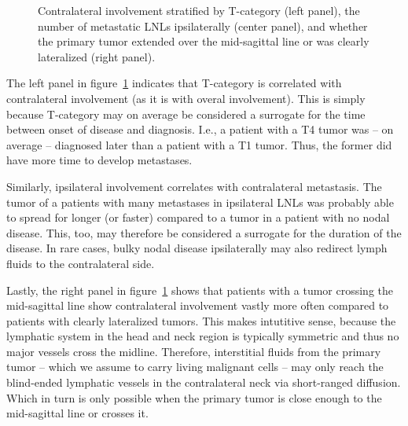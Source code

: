 \documentclass[
  sn-mathphys-num,
]{sn-jnl}
\begin{document}
\begin{figure}


\caption{\label{fig-data-strat}Contralateral involvement stratified by
T-category (left panel), the number of metastatic LNLs ipsilaterally
(center panel), and whether the primary tumor extended over the
mid-sagittal line or was clearly lateralized (right panel).}

\end{figure}%

The left panel in figure~\ref{fig-data-strat} indicates that T-category
is correlated with contralateral involvement (as it is with overal
involvement). This is simply because T-category may on average be
considered a surrogate for the time between onset of disease and
diagnosis. I.e., a patient with a T4 tumor was -- on average --
diagnosed later than a patient with a T1 tumor. Thus, the former did
have more time to develop metastases.

Similarly, ipsilateral involvement correlates with contralateral
metastasis. The tumor of a patients with many metastases in ipsilateral
LNLs was probably able to spread for longer (or faster) compared to a
tumor in a patient with no nodal disease. This, too, may therefore be
considered a surrogate for the duration of the disease. In rare cases,
bulky nodal disease ipsilaterally may also redirect lymph fluids to the
contralateral side.

Lastly, the right panel in figure~\ref{fig-data-strat} shows that
patients with a tumor crossing the mid-sagittal line show contralateral
involvement vastly more often compared to patients with clearly
lateralized tumors. This makes intutitive sense, because the lymphatic
system in the head and neck region is typically symmetric and thus no
major vessels cross the midline. Therefore, interstitial fluids from the
primary tumor -- which we assume to carry living malignant cells -- may
only reach the blind-ended lymphatic vessels in the contralateral neck
via short-ranged diffusion. Which in turn is only possible when the
primary tumor is close enough to the mid-sagittal line or crosses it.
\end{document}
